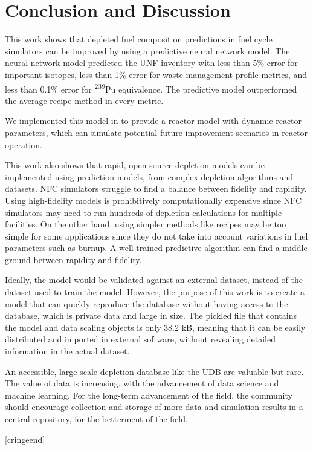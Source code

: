 \section{Conclusion and Discussion}

This work shows that depleted fuel composition predictions
in fuel cycle simulators can be improved
by using a predictive neural network  model.
The neural network model predicted the \gls{UNF} inventory
with less than 5\% error for important isotopes,
less than 1\% error for waste management profile metrics, 
and less than 0.1\% error for \textsuperscript{239}Pu equivalence.
The predictive model outperformed the average recipe
method in every metric.

We implemented this model in \Cyclus to provide a
 reactor model with dynamic reactor parameters,
which can simulate potential future improvement scenarios
in reactor operation.

This work also shows that rapid, open-source depletion models
can be implemented using prediction models, from
complex depletion algorithms and
datasets. \gls{NFC} simulators struggle to find a balance
between fidelity and rapidity. Using high-fidelity
models is prohibitively computationally expensive
since \gls{NFC} simulators may need to run
hundreds of depletion calculations for multiple
facilities. On the other hand, using simpler methods
like recipes may be too simple for some applications
since they do not take into account variations in fuel
parameters such as burnup.
A well-trained predictive algorithm can find a middle
ground between rapidity and fidelity.

Ideally, the model would be validated against an external
dataset, instead of the dataset used to train the model.
 However, the purpose
of this work is to create a model that can quickly reproduce the
database without having access to the database, which is private
data
and large in size. The pickled file that contains
the model and data scaling objects is only 38.2 kB, meaning that it
can be easily distributed and imported in external software, without
revealing detailed information in the actual dataset.

An accessible, large-scale depletion database 
like the \gls{UDB} are valuable
but rare. The value of data is increasing,
with the advancement of data science and machine learning.
For the long-term advancement of the field, the
community should encourage collection and storage of more
data and simulation results in
a central repository, for the betterment of the field.

[cringeend]

